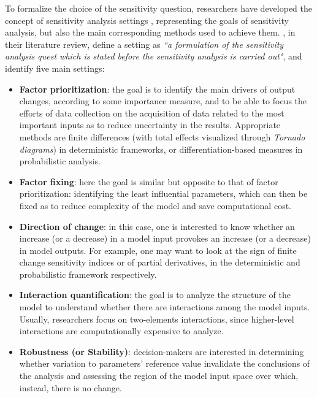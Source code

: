 To formalize the choice of the sensitivity question, researchers have developed the concept of sensitivity analysis settings \cite{Saltelli2002SensitivityAF, Saltelli2002OnTR}, representing the goals of sensitivity analysis, but also the main corresponding methods used to achieve them. \textcite{Borgonovo2016SensitivityAA}, in their literature review, define a setting as \textit{``a formulation of the sensitivity analysis quest which is stated before the sensitivity analysis is carried out"}, and identify five main settings:
\begin{itemize} \label{sa_settings}
    \item \textbf{Factor prioritization}: the goal is to identify the main drivers of output changes, according to some importance measure, and to be able to focus the efforts of data collection on the acquisition of data related to the most important inputs as to reduce uncertainty in the results. Appropriate methods are finite differences (with total effects visualized through \textit{Tornado diagrams}) in deterministic frameworks, or differentiation-based measures in probabilistic analysis.
    \item \textbf{Factor fixing}: here the goal is similar but opposite to that of factor prioritization: identifying the least influential parameters, which can then be fixed as to reduce complexity of the model and save computational cost.
    \item \textbf{Direction of change}: in this case, one is interested to know whether an increase (or a decrease) in a model input provokes an increase (or a decrease) in model outputs. For example, one may want to look at the sign of finite change sensitivity indices or of partial derivatives, in the deterministic and probabilistic framework respectively.
    \item \textbf{Interaction quantification}: the goal is to analyze the structure of the model to understand whether there are interactions among the model inputs. Usually, researchers focus on two-elements interactions, since higher-level interactions are computationally expensive to analyze.
    \item \textbf{Robustness (or Stability)}: decision-makers are interested in determining whether variation to parameters' reference value invalidate the conclusions of the analysis and assessing the region of the model input space over which, instead, there is no change.
\end{itemize}



